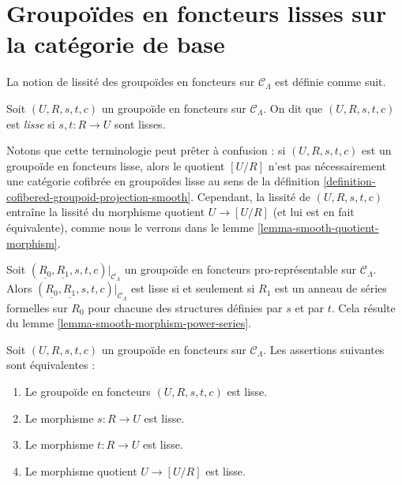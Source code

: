 \section{Groupoïdes en foncteurs lisses sur la catégorie de base}
\label{section-smooth-minimal-groupoids-in-functors}

\noindent
La notion de lissité des groupoïdes en foncteurs sur $\mathcal{C}_\Lambda$ est
définie comme suit.

\begin{definition}
\label{definition-smooth-groupoid-in-functors}
Soit $(U, R, s, t, c)$ un groupoïde en foncteurs sur
$\mathcal{C}_\Lambda$. On dit que $(U, R, s, t, c)$ est {\it lisse} si
$s, t: R \to U$ sont lisses.
\end{definition}

\begin{remark}
\label{remark-smooth-groupoid-in-functors-warning}
Notons que cette terminologie peut prêter à confusion : si
$(U, R, s, t, c)$ est un groupoïde en foncteurs lisse, alors le quotient
$[U/R]$ n'est pas nécessairement une catégorie cofibrée en groupoïdes lisse au
sens de la définition \ref{definition-cofibered-groupoid-projection-smooth}.
Cependant, la lissité de $(U, R, s, t, c)$ entraîne la lissité du morphisme
quotient $U \to [U/R]$ (et lui est en fait équivalente), comme nous le verrons
dans le lemme \ref{lemma-smooth-quotient-morphism}.
\end{remark}

\begin{remark}
\label{remark-smooth-power-series-prorepresentable-smooth-groupoid-in-functors}
Soit $(\underline{R_0}, \underline{R_1}, s, t, c)|_{\mathcal{C}_\Lambda}$ un
groupoïde en foncteurs pro-représentable sur $\mathcal{C}_\Lambda$. Alors
$(\underline{R_0}, \underline{R_1}, s, t, c)|_{\mathcal{C}_\Lambda}$ est
lisse si et seulement si $R_1$ est un anneau de séries formelles sur $R_0$
pour chacune des structures définies par $s$ et par $t$. Cela résulte du lemme
\ref{lemma-smooth-morphism-power-series}.
\end{remark}

\begin{lemma}
\label{lemma-smooth-quotient-morphism}
Soit $(U, R, s, t, c)$ un groupoïde en foncteurs sur
$\mathcal{C}_\Lambda$. Les assertions suivantes sont équivalentes :
\begin{enumerate}
\item Le groupoïde en foncteurs $(U, R, s, t, c)$ est lisse.
\item Le morphisme $s : R \to U$ est lisse.
\item Le morphisme $t : R \to U$ est lisse.
\item Le morphisme quotient $U \to [U/R]$ est lisse.
\end{enumerate}
\end{lemma}

